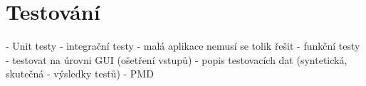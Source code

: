 \chapter{Testování}
 - Unit testy 
 - integrační testy - malá aplikace nemusí se tolik řešit
 - funkční testy - testovat na úrovni GUI (ošetření vstupů)
 - popis testovacích dat (syntetická, skutečná - výsledky testů)
 - PMD
